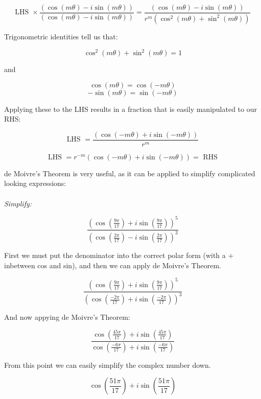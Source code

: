 \documentclass{article}
\begin{document}
\[\text{LHS  }\times\frac{\left(\cos\left(m\theta\right)-i\sin\left(m\theta\right)\right)}{\left(\cos\left(m\theta\right)-i\sin\left(m\theta\right)\right)}=\frac{\left(\cos\left(m\theta\right)-i\sin\left(m\theta\right)\right)}{r^m\left(\cos^2\left(m\theta\right)+\sin^2\left(m\theta\right)\right)}\]

\noindent Trigonometric identities tell us that:

\[\cos^2\left(m\theta\right)+\sin^2\left(m\theta\right)=1\]

\noindent and

\[\cos\left(m\theta\right)=\cos\left(-m\theta\right)\]
\[-\sin\left(m\theta\right)=\sin\left(-m\theta\right)\]

\noindent Applying these to the LHS results in a fraction that is easily manipulated to our RHS:

\[\text{LHS  }=\frac{\left(\cos\left(-m\theta\right)+i\sin\left(-m\theta\right)\right)}{r^m}\]

\[\text{LHS  }=r^{-m}\left(\cos\left(-m\theta\right)+i\sin\left(-m\theta\right)\right)=\text{  RHS}\]

\noindent de Moivre's Theorem is very useful, as it can be applied to simplify complicated looking expressions: \\\\

\noindent \textit{Simplify:}

\[\frac{\left(\cos\left(\frac{9\pi}{17}\right)+i\sin\left(\frac{9\pi}{17}\right)\right)^5}{\left(\cos\left(\frac{2\pi}{17}\right)-i\sin\left(\frac{2\pi}{17}\right)\right)^3}\]

\noindent First we must put the denominator into the correct polar form (with a \(+\) inbetween cos and sin), and then we can apply de Moivre's Theorem.

\[\frac{\left(\cos\left(\frac{9\pi}{17}\right)+i\sin\left(\frac{9\pi}{17}\right)\right)^5}{\left(\cos\left(\frac{-2\pi}{17}\right)+i\sin\left(\frac{-2\pi}{17}\right)\right)^3}\]

\noindent And now appying de Moivre's Theorem:

\[\frac{\cos\left(\frac{45\pi}{17}\right)+i\sin\left(\frac{45\pi}{17}\right)}{\cos\left(\frac{-6\pi}{17}\right)+i\sin\left(\frac{-6\pi}{17}\right)}\]

\noindent From this point we can easily simplify the complex number down.

\[\cos\left(\frac{51\pi}{17}\right)+i\sin\left(\frac{51\pi}{17}\right)\]
\end{document}
